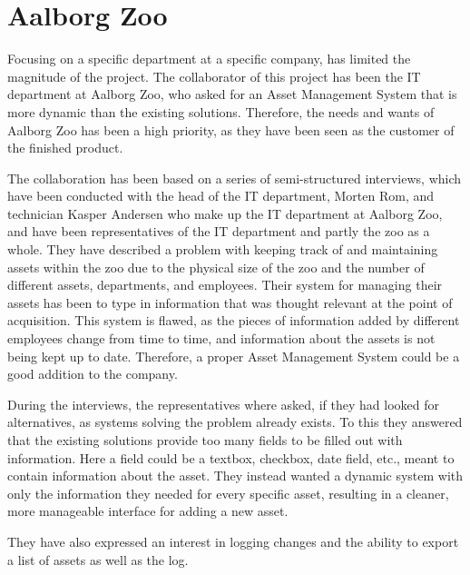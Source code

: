 \section{Aalborg Zoo}\label{ch:problemdefinition}
Focusing on a specific department at a specific company, has limited the magnitude of the project. The collaborator of this project has been the IT department at Aalborg Zoo, who asked for an Asset Management System that is more dynamic than the existing solutions. Therefore, the needs and wants of Aalborg Zoo has been a high priority, as they have been seen as the customer of the finished product.
\par
The collaboration has been based on a series of semi-structured interviews, which have been conducted with the head of the IT department, Morten Rom, and technician Kasper Andersen who make up the IT department at Aalborg Zoo, and have been representatives of the IT department and partly the zoo as a whole. They have described a problem with keeping track of and maintaining assets within the zoo due to the physical size of the zoo and the number of different assets, departments, and employees. Their system for managing their assets has been to type in information that was thought relevant at the point of acquisition. This system is flawed, as the pieces of information added by different employees change from time to time, and information about the assets is not being kept up to date. Therefore, a proper Asset Management System could be a good addition to the company.
\par
During the interviews, the representatives where asked, if they had looked for alternatives, as systems solving the problem already exists. To this they answered that the existing solutions provide too many fields to be filled out with information. Here a field could be a textbox, checkbox, date field, etc., meant to contain information about the asset. They instead wanted a dynamic system with only the information they needed for every specific asset, resulting in a cleaner, more manageable interface for adding a new asset.
\par
They have also expressed an interest in logging changes and the ability to export a list of assets as well as the log. 



